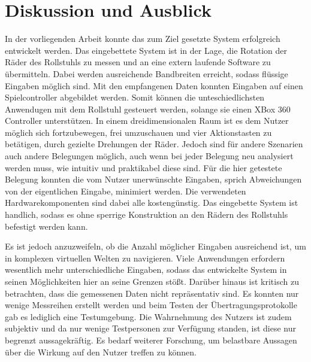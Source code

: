 \chapter{Diskussion und Ausblick}
In der vorliegenden Arbeit konnte das zum Ziel gesetzte System erfolgreich entwickelt werden.
Das eingebettete System ist in der Lage, die Rotation der Räder des Rollstuhls zu messen und an eine extern laufende Software zu übermitteln.
Dabei werden ausreichende Bandbreiten erreicht, sodass flüssige Eingaben möglich sind.
Mit den empfangenen Daten konnten Eingaben auf einen Spielcontroller abgebildet werden.
Somit können die unteschiedlichsten Anwendugen mit dem Rollstuhl gesteuert werden, solange sie einen XBox 360 Controller unterstützen.
In einem dreidimensionalen Raum ist es dem Nutzer möglich sich fortzubewegen, frei umzuschauen und vier Aktionstasten zu betätigen, durch gezielte Drehungen der Räder.
Jedoch sind für andere Szenarien auch andere Belegungen möglich, auch wenn bei jeder Belegung neu analysiert werden muss, wie intuitiv und praktikabel diese sind.
Für die hier getestete Belegung konnten die vom Nutzer unerwünschte Eingaben, sprich Abweichungen von der eigentlichen Eingabe, minimiert werden.
Die verwendeten Hardwarekomponenten sind dabei alle kostengünstig.
Das eingebette System ist handlich, sodass es ohne sperrige Konstruktion an den Rädern des Rollstuhls befestigt werden kann.

Es ist jedoch anzuzweifeln, ob die Anzahl möglicher Eingaben ausreichend ist, um in komplexen virtuellen Welten zu navigieren.
Viele Anwendungen erfordern wesentlich mehr unterschiedliche Eingaben, sodass das entwickelte System in seinen Möglichkeiten hier an seine Grenzen stößt.
Darüber hinaus ist kritisch zu betrachten, dass die gemessenen Daten nicht repräsentativ sind.
Es konnten nur wenige Messreihen erstellt werden und beim Testen der Übertragungsprotokolle gab es lediglich eine Testumgebung.
Die Wahrnehmung des Nutzers ist zudem subjektiv und da nur wenige Testpersonen zur Verfügung standen, ist diese nur begrenzt aussagekräftig.
Es bedarf weiterer Forschung, um belastbare Aussagen über die Wirkung auf den Nutzer treffen zu können.

